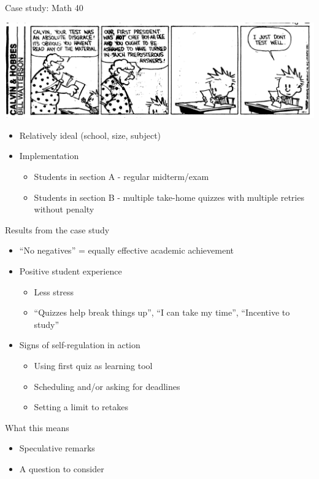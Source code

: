 \documentclass{beamer}
\begin{document}
\begin{frame}{Case study: Math 40}

  \includegraphics[width=\textwidth]{ch.jpg}

  \begin{itemize}
    \item Relatively ideal (school, size, subject)
    \item Implementation
    \begin{itemize}
      \item Students in section A - regular midterm/exam
      \item Students in section B - multiple take-home quizzes with multiple retries without penalty
    \end{itemize}
  \end{itemize}
\end{frame}
\begin{frame}{Results from the case study}
  \begin{itemize}
    \item ``No negatives'' = equally effective academic achievement
    \item Positive student experience
    \begin{itemize}
      \item Less stress
      \item ``Quizzes help break things up'', ``I can take my time'', ``Incentive to study''
    \end{itemize}
    \item Signs of self-regulation in action
    \begin{itemize}
      \item Using first quiz as learning tool
      \item Scheduling and/or asking for deadlines
      \item Setting a limit to retakes
    \end{itemize}
  \end{itemize}
\end{frame}
\begin{frame}{What this means}
  \begin{itemize}
    \item Speculative remarks
    \item A question to consider
  \end{itemize}
\end{frame}
\end{document}
